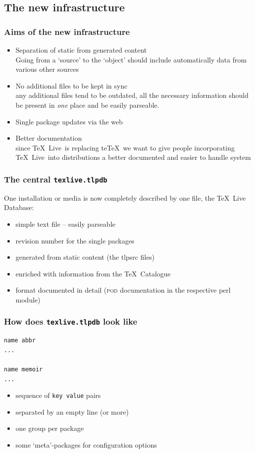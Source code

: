 \documentclass{beamer}
\newcommand{\tl}{\TeX~Live}
\begin{document}
\subsection{The new infrastructure}

\begin{frame}
  \frametitle{Aims of the new infrastructure}
  \begin{itemize}
  \item Separation of static from generated content\\
    Going from a `source' to the `object' should include automatically
    data from various other sources \pause
  \item No additional files to be kept in sync\\
    any additional files tend to be outdated, all the necessary
    information should be present in \emph{one} place and be easily
    parseable. \pause
  \item Single package updates via the web\pause
  \item Better documentation\\
    since \tl\ is replacing te\TeX\ we want to give people
    incorporating \tl\ into distributions a better documented and
    easier to handle system
  \end{itemize}
\end{frame}

\begin{frame}
  \frametitle{The central \texttt{texlive.tlpdb}}
  One installation or media is now completely described by one file,
  the \TeX~Live Database:
  \begin{itemize}
  \item simple text file -- easily parseable
  \item revision number for the single packages
  \item generated from static content (the tlpsrc files)
  \item enriched with information from the \TeX~Catalogue
  \item format documented in detail (\textsc{pod} documentation in the
    respective perl module)
  \end{itemize}
\end{frame}

\begin{frame}[fragile]
  \frametitle{How does \texttt{texlive.tlpdb} look like}
  \begin{lstlisting}[title={texlive.tlpdb}]
name abbr
...

name memoir
...

\end{lstlisting}
  \begin{itemize}
  \item sequence of \texttt{key value} pairs
  \item separated by an empty line (or more)
  \item one group per package
  \item some `meta'-packages for configuration options
  \end{itemize}
\end{frame}
\end{document}

